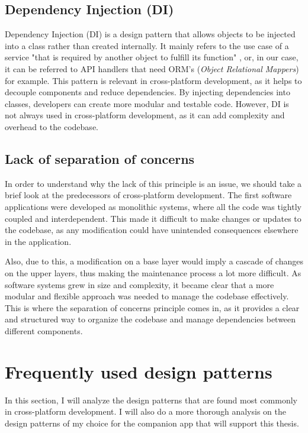 \subsection{Dependency Injection (DI)}
Dependency Injection (DI) is a design pattern that allows objects to be injected into a class rather than created internally.
It mainly refers to the use case of a service "that is required by another object to fulfill its function" \cite{depInjection}, or, in our case,
it can be referred to API handlers that need ORM's (\textit{Object Relational Mappers}) for example.
This pattern is relevant in cross-platform development, as it helps to decouple components and reduce dependencies.
By injecting dependencies into classes, developers can create more modular and testable code.
However, DI is not always used in cross-platform development, as it can add complexity and overhead to the codebase.

\subsection{Lack of separation of concerns}
In order to understand why the lack of this principle is an issue, we should take a brief look at the predecessors of cross-platform development.
The first software applications were developed as monolithic systems, where all the code was tightly coupled and interdependent.
This made it difficult to make changes or updates to the codebase, as any modification could have unintended consequences elsewhere in the application.

\par
Also, due to this, a modification on a base layer would imply a cascade of changes on the upper layers, thus making the maintenance process a lot more difficult.
As software systems grew in size and complexity, it became clear that a more modular and flexible approach was needed to manage the codebase effectively.
This is where the separation of concerns principle comes in, 
as it provides a clear and structured way to organize the codebase and manage dependencies between different components.

\section{Frequently used design patterns}
\par
In this section, I will analyze the design patterns that are found most commonly in cross-platform development. 
I will also do a more thorough analysis on the design patterns of my choice for the companion app that will support this thesis.

